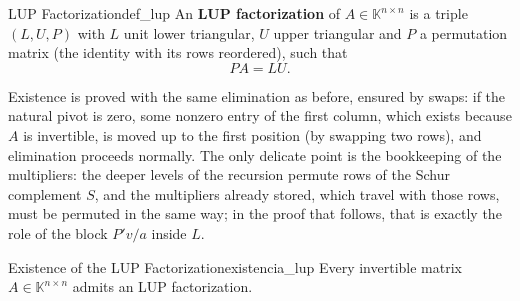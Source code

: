 \documentclass[11pt, a4paper]{article}
\begin{document}
\begin{definicion}{LUP Factorization}{def_lup}
An \textbf{LUP factorization} of $A \in \mathbb{K}^{n \times n}$ is a triple $(L, U, P)$ with $L$ unit lower triangular, $U$ upper triangular and $P$ a permutation matrix (the identity with its rows reordered), such that
\[
P A = L U.
\]
\end{definicion}

Existence is proved with the same elimination as before, ensured by swaps: if the natural pivot is zero, some nonzero entry of the first column, which exists because $A$ is invertible, is moved up to the first position (by swapping two rows), and elimination proceeds normally. The only delicate point is the bookkeeping of the multipliers: the deeper levels of the recursion permute rows of the Schur complement $S$, and the multipliers already stored, which travel with those rows, must be permuted in the same way; in the proof that follows, that is exactly the role of the block $P'v/a$ inside $L$.

\begin{teorema}{Existence of the LUP Factorization}{existencia_lup}
Every invertible matrix $A \in \mathbb{K}^{n \times n}$ admits an LUP factorization.
\end{teorema}
\end{document}

